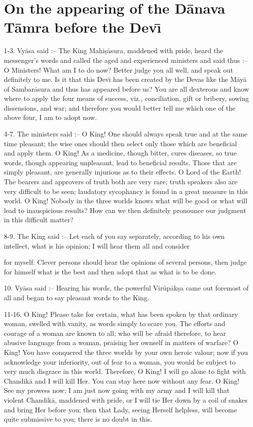 \chapter{On the appearing of the D\=anava T\=amra before the Dev\={\i}}

1-3. Vy\=asa said :-- The King Mahi\d{s}\=asura, maddened with pride, heard the messenger's words and called the aged and experienced ministers and said thus :-- O Ministers! What am I to do now? Better judge you all well, and speak out definitely to me. Is it that this Dev\={\i} has been created by the Devas like the M\=ay\=a of Sambar\=asura and thus has appeared before us? You are all dexterous and know where to apply the four means of success, viz., conciliation, gift or bribery, sowing dissensions, and war; and therefore you would better tell me which one of the above four, I am to adopt now.

4-7. The ministers said :-- O King! One should always speak true and at the same time pleasant; the wise ones should then select only those which are beneficial and apply them. O King! As a medicine, though bitter, cures diseases, so true words, though appearing unpleasant, lead to beneficial results. Those that are simply pleasant, are generally injurious as to their effects. O Lord of the Earth! The bearers and approvers of truth both are very rare; truth speakers also are very difficult to be seen; laudatory sycophancy is found in a great measure in this world. O King! Nobody in the three worlds knows what will be good or what will lead to inauspicious results? How can we then definitely pronounce our judgment in this difficult matter?

8-9. The King said :-- Let each of you say separately, according to his own intellect, what is his opinion; I will hear them all and consider

for myself. Clever persons should hear the opinions of several persons, then judge for himself what is the best and then adopt that as what is to be done.

10. Vy\=asa said :-- Hearing his words, the powerful Vir\=up\=ak\d{s}a came out foremost of all and began to say pleasant words to the King.

11-16. O King! Please take for certain, what has been spoken by that ordinary woman, swelled with vanity, as words simply to scare you. The efforts and courage of a woman are known to all; who will be afraid therefore, to hear abusive language from a woman, praising her ownself in matters of warfare? O King! You have conquered the three worlds by your own heroic valour; now if you acknowledge your inferiority, out of fear to a woman, you would be subject to very much disgrace in this world. Therefore, O King! I will go alone to fight with Chandik\=a and I will kill Her. You can stay here now without any fear. O King! See my prowess now; I am just now going with my army and I will kill that violent Chandik\=a, maddened with pride, or I will tie Her down by a coil of snakes and bring Her before you; then that Lady, seeing Herself helpless, will become quite submissive to you; there is no doubt in this.

